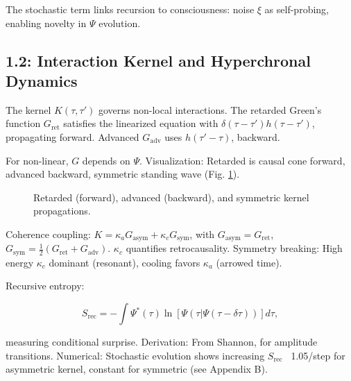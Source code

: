 \documentclass[12pt]{article}
\theoremstyle{definition}
\begin{document}
The stochastic term links recursion to consciousness: noise $\xi$ as self-probing, enabling novelty in $\Psi$ evolution.

\subsection{1.2: Interaction Kernel and Hyperchronal Dynamics}

The kernel $K(\tau,\tau')$ governs non-local interactions. The retarded Green's function $G_{\text{ret}}$ satisfies the linearized equation with $\delta(\tau - \tau') h(\tau - \tau')$, propagating forward. Advanced $G_{\text{adv}}$ uses $h(\tau' - \tau)$, backward.

For non-linear, $G$ depends on $\Psi$. Visualization: Retarded is causal cone forward, advanced backward, symmetric standing wave (Fig. \ref{fig:greens}).

\begin{figure}[htbp]
\centering
{}
\caption{Retarded (forward), advanced (backward), and symmetric kernel propagations.}
\label{fig:greens}
\end{figure}

Coherence coupling: $K = \kappa_a G_{\text{asym}} + \kappa_c G_{\text{sym}}$, with $G_{\text{asym}} = G_{\text{ret}}$, $G_{\text{sym}} = \frac{1}{2}(G_{\text{ret}} + G_{\text{adv}})$. $\kappa_c$ quantifies retrocausality. Symmetry breaking: High energy $\kappa_c$ dominant (resonant), cooling favors $\kappa_a$ (arrowed time).

Recursive entropy:

\begin{equation}
S_{\text{rec}} = - \int \Psi^* (\tau) \ln [\Psi(\tau | \Psi(\tau - \delta \tau))] d\tau,
\end{equation}

measuring conditional surprise. Derivation: From Shannon, for amplitude transitions. Numerical: Stochastic evolution shows increasing $S_{\text{rec}}$ ~1.05/step for asymmetric kernel, constant for symmetric (see Appendix B).
\end{document}

